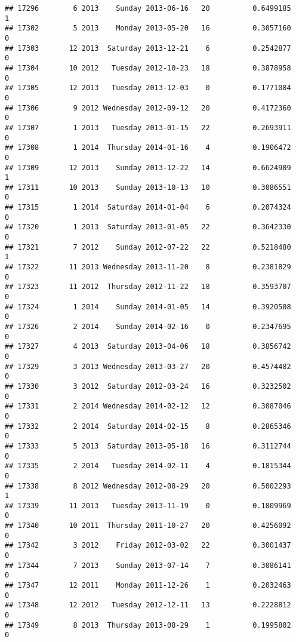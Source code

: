 \documentclass[
]{article}
\begin{document}
\begin{verbatim}
## 17296        6 2013    Sunday 2013-06-16   20          0.6499185             1
## 17302        5 2013    Monday 2013-05-20   16          0.3057160             0
## 17303       12 2013  Saturday 2013-12-21    6          0.2542877             0
## 17304       10 2012   Tuesday 2012-10-23   18          0.3878958             0
## 17305       12 2013   Tuesday 2013-12-03    0          0.1771084             0
## 17306        9 2012 Wednesday 2012-09-12   20          0.4172360             0
## 17307        1 2013   Tuesday 2013-01-15   22          0.2693911             0
## 17308        1 2014  Thursday 2014-01-16    4          0.1906472             0
## 17309       12 2013    Sunday 2013-12-22   14          0.6624909             1
## 17311       10 2013    Sunday 2013-10-13   10          0.3086551             0
## 17315        1 2014  Saturday 2014-01-04    6          0.2074324             0
## 17320        1 2013  Saturday 2013-01-05   22          0.3642330             0
## 17321        7 2012    Sunday 2012-07-22   22          0.5218480             1
## 17322       11 2013 Wednesday 2013-11-20    8          0.2381829             0
## 17323       11 2012  Thursday 2012-11-22   18          0.3593707             0
## 17324        1 2014    Sunday 2014-01-05   14          0.3920508             0
## 17326        2 2014    Sunday 2014-02-16    0          0.2347695             0
## 17327        4 2013  Saturday 2013-04-06   18          0.3856742             0
## 17329        3 2013 Wednesday 2013-03-27   20          0.4574482             0
## 17330        3 2012  Saturday 2012-03-24   16          0.3232502             0
## 17331        2 2014 Wednesday 2014-02-12   12          0.3087046             0
## 17332        2 2014  Saturday 2014-02-15    8          0.2865346             0
## 17333        5 2013  Saturday 2013-05-18   16          0.3112744             0
## 17335        2 2014   Tuesday 2014-02-11    4          0.1815344             0
## 17338        8 2012 Wednesday 2012-08-29   20          0.5002293             1
## 17339       11 2013   Tuesday 2013-11-19    0          0.1809969             0
## 17340       10 2011  Thursday 2011-10-27   20          0.4256092             0
## 17342        3 2012    Friday 2012-03-02   22          0.3001437             0
## 17344        7 2013    Sunday 2013-07-14    7          0.3086141             0
## 17347       12 2011    Monday 2011-12-26    1          0.2032463             0
## 17348       12 2012   Tuesday 2012-12-11   13          0.2228812             0
## 17349        8 2013  Thursday 2013-08-29    1          0.1995802             0

\end{verbatim}
\end{document}
